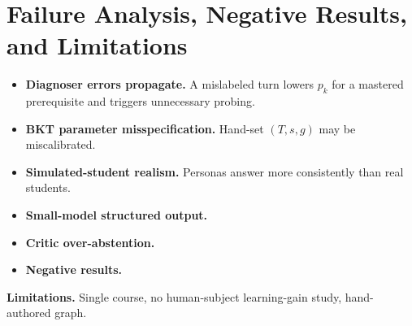 \section{Failure Analysis, Negative Results, and Limitations}
\begin{itemize}
\item \textbf{Diagnoser errors propagate.} A mislabeled turn lowers $p_k$ for a mastered prerequisite and triggers unnecessary probing. 
\item \textbf{BKT parameter misspecification.} Hand-set $(T,s,g)$ may be miscalibrated. 
\item \textbf{Simulated-student realism.} Personas answer more consistently than real students. 
\item \textbf{Small-model structured output.} 
\item \textbf{Critic over-abstention.} 
\item \textbf{Negative results.} 
\end{itemize}
\textbf{Limitations.} Single course, no human-subject learning-gain study, hand-authored graph. 
